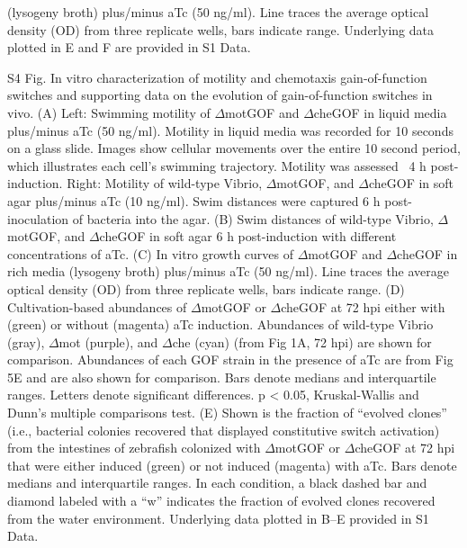 (lysogeny broth) plus/minus aTc (50 ng/ml). Line traces the average optical density (OD) from three replicate wells, bars indicate range. Underlying data plotted in E and F are provided in S1 Data.

S4 Fig. In vitro characterization of motility and chemotaxis gain-of-function switches and supporting data on the evolution of gain-of-function switches in vivo. 
(A) Left: Swimming motility of $\Delta$motGOF and $\Delta$cheGOF in liquid media plus/minus aTc (50 ng/ml). Motility in liquid media was recorded for 10 seconds on a glass slide. Images show cellular movements over the entire 10 second period, which illustrates each cell's swimming trajectory. Motility was assessed ~4 h post-induction. Right: Motility of wild-type Vibrio, $\Delta$motGOF, and $\Delta$cheGOF in soft agar plus/minus aTc (10 ng/ml). Swim distances were captured 6 h post-inoculation of bacteria into the agar. (B) Swim distances of wild-type Vibrio, $\Delta$motGOF, and $\Delta$cheGOF in soft agar 6 h post-induction with different concentrations of aTc. (C) In vitro growth curves of $\Delta$motGOF and $\Delta$cheGOF in rich media (lysogeny broth) plus/minus aTc (50 ng/ml). Line traces the average optical density (OD) from three replicate wells, bars indicate range. (D) Cultivation-based abundances of $\Delta$motGOF or $\Delta$cheGOF at 72 hpi either with (green) or without (magenta) aTc induction. Abundances of wild-type Vibrio (gray), $\Delta$mot (purple), and $\Delta$che (cyan) (from Fig 1A, 72 hpi) are shown for comparison. Abundances of each GOF strain in the presence of aTc are from Fig 5E and are also shown for comparison. Bars denote medians and interquartile ranges. Letters denote significant differences. p < 0.05, Kruskal-Wallis and Dunn's multiple comparisons test. (E) Shown is the fraction of ``evolved clones'' (i.e., bacterial colonies recovered that displayed constitutive switch activation) from the intestines of zebrafish colonized with $\Delta$motGOF or $\Delta$cheGOF at 72 hpi that were either induced (green) or not induced (magenta) with aTc. Bars denote medians and interquartile ranges. In each condition, a black dashed bar and diamond labeled with a ``w'' indicates the fraction of evolved clones recovered from the water environment. Underlying data plotted in B–E provided in S1 Data.


